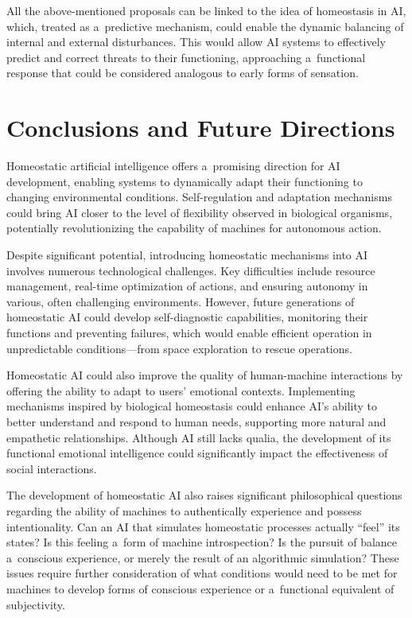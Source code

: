 \documentclass[%
  manuscript=article,
  year=2024,
  volume=77,
  doi=00000.000,
]{zfn}
\begin{document}
All the above-mentioned proposals can be linked to the idea of homeostasis in AI, which, treated as a~predictive mechanism, could enable the dynamic balancing of internal and external disturbances. This would allow AI systems to effectively predict and correct threats to their functioning, approaching a~functional response that could be considered analogous to early forms of sensation.



\section*{Conclusions and Future Directions}

Homeostatic artificial intelligence offers a~promising direction for AI development, enabling systems to dynamically adapt their functioning to changing environmental conditions. Self-regulation and adaptation mechanisms could bring AI closer to the level of flexibility observed in biological organisms, potentially revolutionizing the capability of machines for autonomous action.



Despite significant potential, introducing homeostatic mechanisms into AI involves numerous technological challenges. Key difficulties include resource management, real-time optimization of actions, and ensuring autonomy in various, often challenging environments. However, future generations of homeostatic AI could develop self-diagnostic capabilities, monitoring their functions and preventing failures, which would enable efficient operation in unpredictable conditions---from space exploration to rescue operations.



Homeostatic AI could also improve the quality of human-machine interactions by offering the ability to adapt to users' emotional contexts. Implementing mechanisms inspired by biological homeostasis could enhance AI's ability to better understand and respond to human needs, supporting more natural and empathetic relationships. Although AI still lacks qualia, the development of its functional emotional intelligence could significantly impact the effectiveness of social interactions.



The development of homeostatic AI also raises significant philosophical questions regarding the ability of machines to authentically experience and possess intentionality. Can an AI that simulates homeostatic processes actually ``feel'' its states? Is this feeling a~form of machine introspection? Is the pursuit of balance a~conscious experience, or merely the result of an algorithmic simulation? These issues require further consideration of what conditions would need to be met for machines to develop forms of conscious experience or a~functional equivalent of subjectivity.
\end{document}
